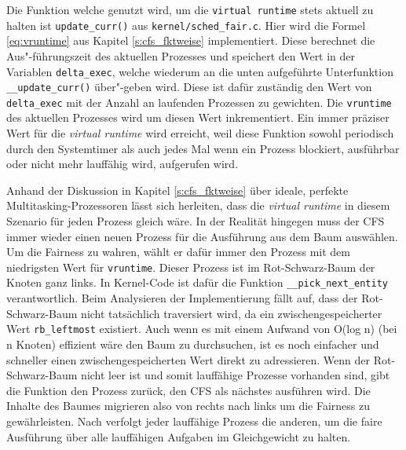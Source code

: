 Die Funktion welche genutzt wird, um die  \texttt{virtual \- runtime} stets aktuell zu halten ist \texttt{update\_curr()} aus \texttt{kernel/sched\_fair.c}. Hier wird die Formel \ref{eq:vruntime} aus Kapitel \ref{s:cfs_fktweise} implementiert. Diese berechnet die Aus"-führungszeit des aktuellen Prozesses und speichert den Wert in der Variablen \texttt{delta\_exec}, welche wiederum an die unten aufgeführte Unterfunktion \texttt{\_\_update\_curr()} über"-geben wird. Diese ist dafür zuständig den Wert von \texttt{delta\-\_exec} mit der Anzahl an laufenden Prozessen zu gewichten. Die \texttt{vruntime} des aktuellen Prozesses wird um diesen Wert inkrementiert.  Ein immer präziser Wert für die \textit{virtual runtime} wird erreicht, weil diese Funktion sowohl periodisch durch den Systemtimer als auch jedes Mal wenn ein Prozess blockiert, ausführbar oder nicht mehr lauffähig wird, aufgerufen wird. 

Anhand der Diskussion in Kapitel \ref{s:cfs_fktweise} über ideale, perfekte Multitasking-Prozessoren lässt sich herleiten, dass die \textit{virtual runtime} in diesem Szenario für jeden Prozess gleich wäre. In der Realität hingegen muss der CFS immer wieder einen neuen Prozess für die Ausführung aus dem Baum auswählen. Um die Fairness zu wahren, wählt er dafür immer den Prozess mit dem niedrigsten Wert für \texttt{vruntime}. Dieser Prozess ist im Rot-Schwarz-Baum der Knoten ganz links. In Kernel-Code ist dafür die Funktion \texttt{\_\_pick\_next\_entity} verantwortlich. Beim Analysieren der Implementierung fällt auf, dass der Rot-Schwarz-Baum nicht tatsächlich traversiert wird, da ein zwischengespeicherter Wert \texttt{rb\_leftmost} existiert. Auch wenn es mit einem Aufwand von O(log n) (bei n Knoten) effizient wäre den Baum zu durchsuchen, ist es noch einfacher und schneller einen zwischengespeicherten Wert direkt zu adressieren. Wenn der Rot-Schwarz-Baum nicht leer ist und somit lauffähige Prozesse vorhanden sind, gibt die Funktion den Prozess zurück, den CFS als nächstes ausführen wird. Die Inhalte des Baumes migrieren also von rechts nach links um die Fairness zu gewährleisten. Nach \cite{mjones} verfolgt jeder lauffähige Prozess die anderen, um die faire Ausführung über alle lauffähigen Aufgaben im Gleichgewicht zu halten.

